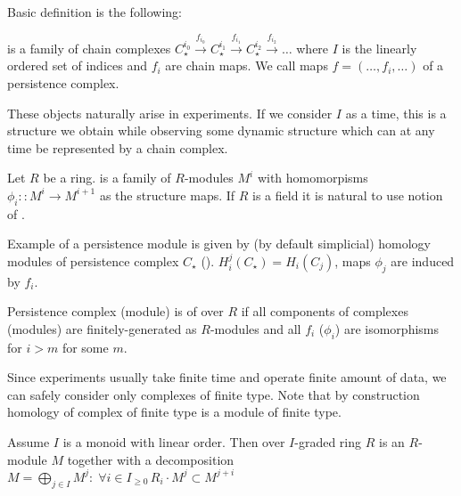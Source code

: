 Basic definition is the following:

\begin{definition}
   is a family of chain complexes $C_{\star}^{i_0} \xrightarrow{f_{i_0}} C_{\star}^{i_1} \xrightarrow{f_{i_1}} C_{\star}^{i_2} \xrightarrow{f_{i_2}} \ldots$ where $I$ is the linearly ordered set of indices and $f_i$ are chain maps. We call maps $f=(\ldots,f_i,\ldots)$  of a persistence complex.
\end{definition}

These objects naturally arise in experiments. If we consider $I$ as a time, this is a structure we obtain while observing some dynamic structure which can at any time be represented by a chain complex.\\

\begin{definition}
  Let $R$ be a ring.  is a family of $R$-modules $M^i$ with homomorpisms $\phi_i :: M^i \to M^{i+1}$ as the structure maps. If $R$ is a field it is natural to use notion of .
\end{definition}

Example of a persistence module is given by (by default simplicial) homology modules of persistence complex $C_{\star}$ (). $H_i^j(C_{\star}) = H_i(C_{j})$, maps $\phi_j$ are induced by $f_i$.\\

\begin{definition}
  Persistence complex (module) is of  over $R$ if all components of complexes (modules) are finitely-generated as $R$-modules and all $f_i$ ($\phi_i$) are isomorphisms for $i > m$ for some $m$.
\end{definition}

Since experiments usually take finite time and operate finite amount of data, we can safely consider only complexes of finite type. Note that by construction homology of complex of finite type is a module of finite type.\\

\begin{definition}
  Assume $I$ is a monoid with linear order. Then  over $I$-graded ring $R$ is an $R$-module $M$ together with a decomposition $M = \bigoplus_{j \in I} M^j:\; \forall i \in I_{\geq 0}\, R_i \cdot M^j \subset M^{j+i}$
\end{definition}

